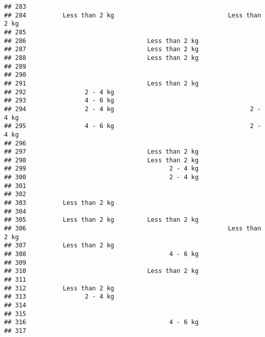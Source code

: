 \documentclass[
]{article}
\begin{document}
\begin{verbatim}
## 283                                                                     
## 284          Less than 2 kg                               Less than 2 kg
## 285                                                                     
## 286                                 Less than 2 kg                      
## 287                                 Less than 2 kg                      
## 288                                 Less than 2 kg                      
## 289                                                                     
## 290                                                                     
## 291                                 Less than 2 kg                      
## 292                2 - 4 kg                                             
## 293                4 - 6 kg                                             
## 294                2 - 4 kg                                     2 - 4 kg
## 295                4 - 6 kg                                     2 - 4 kg
## 296                                                                     
## 297                                 Less than 2 kg                      
## 298                                 Less than 2 kg                      
## 299                                       2 - 4 kg                      
## 300                                       2 - 4 kg                      
## 301                                                                     
## 302                                                                     
## 303          Less than 2 kg                                             
## 304                                                                     
## 305          Less than 2 kg         Less than 2 kg                      
## 306                                                       Less than 2 kg
## 307          Less than 2 kg                                             
## 308                                       4 - 6 kg                      
## 309                                                                     
## 310                                 Less than 2 kg                      
## 311                                                                     
## 312          Less than 2 kg                                             
## 313                2 - 4 kg                                             
## 314                                                                     
## 315                                                                     
## 316                                       4 - 6 kg                      
## 317                                                                     

\end{verbatim}
\end{document}
